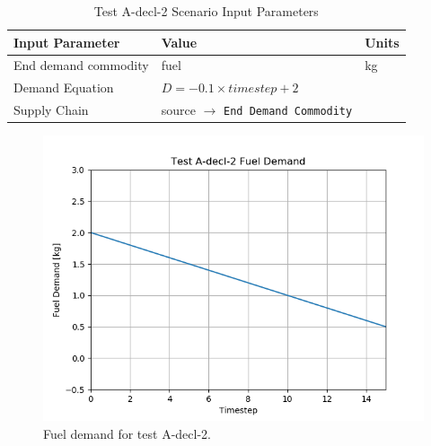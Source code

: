 \documentclass[11pt,letterpaper]{article}
\begin{document}
\begin{table}[H]
	\centering
	\caption{Test A-decl-2 Scenario Input Parameters }
	\label{tab:testA-decl-2}
	\begin{tabular}{|l|l|l|}
		\hline
		\textbf{Input Parameter} & \textbf{Value} & \textbf{Units} \\
		\hline
		End demand commodity & fuel & kg \\
		Demand Equation & $D = -0.1 \times timestep + 2$ & \\
		Supply Chain & source $\rightarrow$ \texttt{End Demand Commodity} &  \\
		\hline
	\end{tabular}
\end{table}

\begin{figure}[H]
	\begin{center}
		\includegraphics[scale=0.7]{./images/A-decl-2.png}
	\end{center}
	\caption{Fuel demand for test A-decl-2.}
	\label{fig:A-decl-2}
\end{figure}
\end{document}
